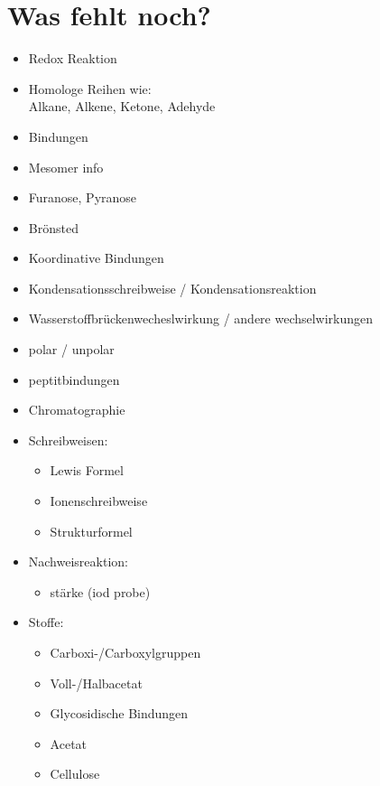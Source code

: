 
\chapter{Was fehlt noch?}
\begin{itemize}
    \item Redox Reaktion
    \item Homologe Reihen wie: \\
        Alkane, Alkene, Ketone, Adehyde
    \item Bindungen
    \item Mesomer info
    \item Furanose, Pyranose
    \item Brönsted
    \item Koordinative Bindungen
    \item Kondensationsschreibweise / Kondensationsreaktion
    \item Wasserstoffbrückenwecheslwirkung / andere wechselwirkungen
    \item polar / unpolar
    \item peptitbindungen
    \item Chromatographie

    \item Schreibweisen:
    \begin{itemize}
        \item Lewis Formel
        \item Ionenschreibweise
        \item Strukturformel
    \end{itemize}

    \item Nachweisreaktion:
    \begin{itemize}
        \item stärke (iod probe)
    \end{itemize}

    \item Stoffe:
    \begin{itemize}
        \item Carboxi-/Carboxylgruppen
        \item Voll-/Halbacetat
        \item Glycosidische Bindungen
        \item Acetat
        \item Cellulose
    \end{itemize}
\end{itemize}

